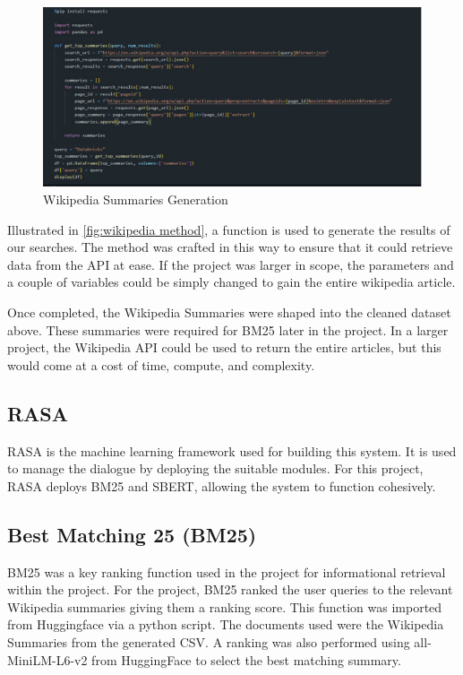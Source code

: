 \documentclass[11pt]{article}
\begin{document}
\begin{figure}[htbp]
  \centering
  \includegraphics[width=\linewidth]{./img/wiki.png}
  \caption{Wikipedia Summaries Generation}
  \label{fig:wikipedia method}
\end{figure}

Illustrated in \autoref{fig:wikipedia method}, a function is used to generate the results of our searches. The method was crafted in this way to ensure that it could retrieve data from the API at ease. If the project was larger in scope, the parameters and a couple of variables could be simply changed to gain the entire wikipedia article. 

Once completed, the Wikipedia Summaries were shaped into the cleaned dataset above. These summaries were required for BM25 later in the project. In a larger project, the Wikipedia API could be used to return the entire articles, but this would come at a cost of time, compute, and complexity.

\subsection{{RASA}}
RASA is the machine learning framework used for building this system. It is used to manage the dialogue by deploying the suitable modules. For this project, RASA deploys BM25 and SBERT, allowing the system to function cohesively. 

\subsection{Best Matching 25 (BM25)}
BM25 was a key ranking function used in the project for informational retrieval within the project. For the project, BM25 ranked the user queries to the relevant Wikipedia summaries giving them a ranking score. This function was imported from Huggingface via a python script. 
 \newline
 \newline
The documents used were the Wikipedia Summaries from the generated CSV. A ranking was also performed using all-MiniLM-L6-v2 from HuggingFace to select the best matching summary.
\end{document}
